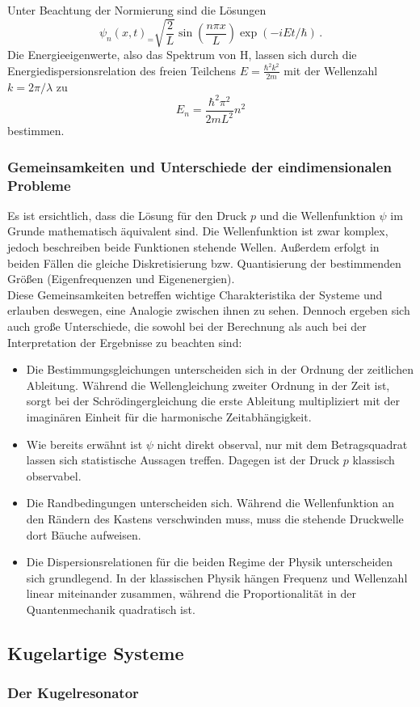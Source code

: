 Unter Beachtung der Normierung sind die Lösungen
\begin{equation}
  \psi_n(x,t)_ = \sqrt{\frac{2}{L}} \sin\left(\frac{n \pi x}{L}\right) \exp(-i E t / \hbar)\,.
  \label{eqn:kastenLoesung}
\end{equation}
Die Energieeigenwerte, also das Spektrum von H, lassen sich durch die Energiedispersionsrelation des freien Teilchens $E = \frac{\hbar^2 k^2}{2m}$ mit der Wellenzahl $k = 2 \pi / \lambda$ zu
\begin{equation}
  E_n = \frac{\hbar^2 \pi^2}{2 m L^2} n^2
  \label{eqn:kastenEnergien}
\end{equation}
bestimmen.

\subsubsection{Gemeinsamkeiten und Unterschiede der eindimensionalen Probleme}
Es ist ersichtlich, dass die Lösung für den Druck $p$ und die Wellenfunktion $\psi$ im Grunde mathematisch äquivalent sind. Die Wellenfunktion ist zwar komplex, jedoch beschreiben beide Funktionen stehende Wellen. Außerdem erfolgt in beiden Fällen die gleiche Diskretisierung bzw. Quantisierung der bestimmenden Größen (Eigenfrequenzen und Eigenenergien).\\
Diese Gemeinsamkeiten betreffen wichtige Charakteristika der Systeme und erlauben deswegen, eine Analogie zwischen ihnen zu sehen. Dennoch ergeben sich auch große Unterschiede, die sowohl bei der Berechnung als auch bei der Interpretation der Ergebnisse zu beachten sind:
\begin{itemize}
  \item Die Bestimmungsgleichungen unterscheiden sich in der Ordnung der zeitlichen Ableitung. Während die Wellengleichung zweiter Ordnung in der Zeit ist, sorgt bei der Schrödingergleichung die erste Ableitung multipliziert mit der imaginären Einheit für die harmonische Zeitabhängigkeit.
  \item Wie bereits erwähnt ist $\psi$ nicht direkt observal, nur mit dem Betragsquadrat lassen sich statistische Aussagen treffen. Dagegen ist der Druck $p$ klassisch observabel.
  \item Die Randbedingungen unterscheiden sich. Während die Wellenfunktion an den Rändern des Kastens verschwinden muss, muss die stehende Druckwelle dort Bäuche aufweisen.
  \item Die Dispersionsrelationen für die beiden Regime der Physik unterscheiden sich grundlegend. In der klassischen Physik hängen Frequenz und Wellenzahl linear miteinander zusammen, während die Proportionalität in der Quantenmechanik quadratisch ist.
\end{itemize}

\subsection{Kugelartige Systeme}
\label{subsec:kugelartig}
\subsubsection{Der Kugelresonator}
